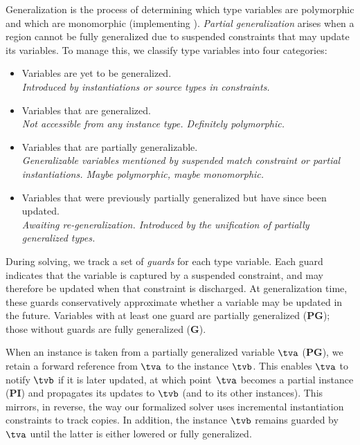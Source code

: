 \documentclass[acmsmall,screen,nonacm%
\Anonymous{,anonymous}{}%
\Final{}{,review}%
]{acmart}
\begin{document}
Generalization is the process of determining which type variables are
polymorphic and which are monomorphic (\ie implementing
).  \emph{Partial generalization} arises when a region
cannot be fully generalized due to suspended constraints that may 
update its variables. To manage this, we classify type variables into four
categories:
\begin{itemize}
  \let \Item \item
  \renewcommand \item [1][]{\Item[(\textbf{#1})]}
  \item[I] Variables are yet to be generalized. \\
    \emph{Introduced by instantiations or source types in constraints.}

  \item[G] Variables that are generalized. \\
    \emph{Not accessible from any instance type. Definitely polymorphic.}

  \item[PG] Variables that are partially generalizable. \\
    \emph{Generalizable variables mentioned by suspended match constraint or partial
    instantiations. Maybe polymorphic, maybe monomorphic.}

  \item[PI] Variables that were previously partially generalized
    but have since been updated.  \\
    \emph{Awaiting re-generalization. Introduced by the unification of partially
    generalized types.}
\end{itemize}

During solving, we track a set of \emph{guards} for each type variable. Each
guard indicates that the variable is captured by a suspended constraint, and may
therefore be updated when that constraint is discharged. At generalization
time, these guards conservatively approximate whether a variable may be
updated in the future. Variables with at least one guard are partially
generalized (\textbf{PG}); those without guards are fully generalized
(\textbf{G}).

When an instance is taken from a partially generalized variable $\tv$
(\textbf{PG}), we retain a forward reference from $\tv$ to the instance $\tvb$.
This enables $\tv$ to notify $\tvb$ if it is later updated, at which
point~$\tv$ becomes a partial instance (\textbf{PI}) and propagates its
updates to $\tvb$ (and to its other instances).
%
This mirrors, in reverse, the way our formalized solver uses incremental
instantiation constraints to track copies. In addition, the instance $\tvb$
remains guarded by $\tv$ until the latter is either lowered or fully
generalized.
\end{document}
